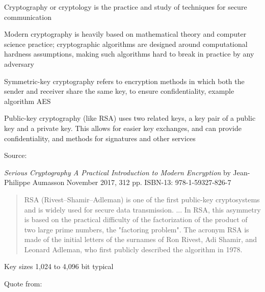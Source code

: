 \documentclass[Screen16to9,17pt]{foils}
\begin{document}
\begin{list1}
\item Cryptography or cryptology is the practice and study of techniques for secure communication
\item Modern cryptography is heavily based on mathematical theory and computer science practice; cryptographic algorithms are designed around computational hardness assumptions, making such algorithms hard to break in practice by any adversary
\item Symmetric-key cryptography refers to encryption methods in which both the sender and receiver share the same key, to ensure confidentiality, example algorithm AES
\item Public-key cryptography (like RSA) uses two related keys, a key pair of a public key and a private key. This allows for easier key exchanges, and can provide confidentiality, and methods for signatures and other services
\end{list1}

Source: 





\emph{Serious Cryptography
A Practical Introduction to Modern Encryption}
by Jean-Philippe Aumasson
November 2017, 312 pp.
ISBN-13:
978-1-59327-826-7




\begin{quote}
RSA (Rivest–Shamir–Adleman) is one of the first public-key cryptosystems and is widely used for secure data transmission. ...
In RSA, this asymmetry is based on the practical difficulty of the factorization of the product of two large prime numbers, the "factoring problem". The acronym RSA is made of the initial letters of the surnames of Ron Rivest, Adi Shamir, and Leonard Adleman, who first publicly described the algorithm in 1978.
\end{quote}

\begin{list2}
\item Key sizes	1,024 to 4,096 bit typical
\item  Quote from: 
\end{list2}
\end{document}
